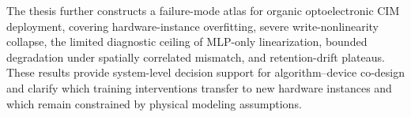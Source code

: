 \documentclass[12pt]{report}
\begin{document}
The thesis further constructs a failure-mode atlas for organic optoelectronic CIM deployment, covering hardware-instance overfitting, severe write-nonlinearity collapse, the limited diagnostic ceiling of MLP-only linearization, bounded degradation under spatially correlated mismatch, and retention-drift plateaus. These results provide system-level decision support for algorithm--device co-design and clarify which training interventions transfer to new hardware instances and which remain constrained by physical modeling assumptions.

\tableofcontents













% 
\end{document}
